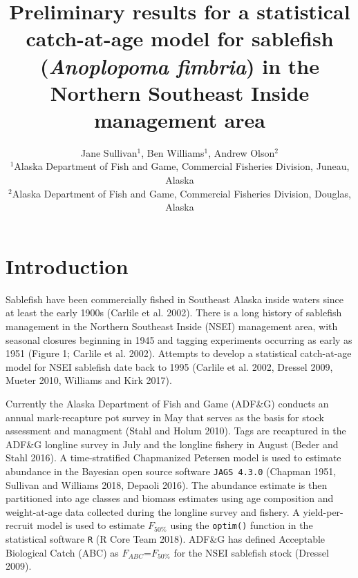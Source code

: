\documentclass[]{article}
\title{Preliminary results for a statistical catch-at-age model for sablefish
(\emph{Anoplopoma fimbria}) in the Northern Southeast Inside management
area}
\author{Jane Sullivan\(^1\), Ben Williams\(^1\), Andrew Olson\(^2\)\\
\(^1\)Alaska Department of Fish and Game, Commercial Fisheries Division,
Juneau, Alaska\\
\(^2\)Alaska Department of Fish and Game, Commercial Fisheries Division,
Douglas, Alaska}
\date{}
\begin{document}
\maketitle

{
\setcounter{tocdepth}{2}
\tableofcontents
}
\section{Introduction}\label{introduction}

Sablefish have been commercially fished in Southeast Alaska inside
waters since at least the early 1900s (Carlile et al. 2002). There is a
long history of sablefish management in the Northern Southeast Inside
(NSEI) management area, with seasonal closures beginning in 1945 and
tagging experiments occurring as early as 1951 (Figure 1; Carlile et al.
2002). Attempts to develop a statistical catch-at-age model for NSEI
sablefish date back to 1995 (Carlile et al. 2002, Dressel 2009, Mueter
2010, Williams and Kirk 2017).

Currently the Alaska Department of Fish and Game (ADF\&G) conducts an
annual mark-recapture pot survey in May that serves as the basis for
stock assessment and managment (Stahl and Holum 2010). Tags are
recaptured in the ADF\&G longline survey in July and the longline
fishery in August (Beder and Stahl 2016). A time-stratified Chapmanized
Petersen model is used to estimate abundance in the Bayesian open source
software \texttt{JAGS\ 4.3.0} (Chapman 1951, Sullivan and Williams 2018,
Depaoli 2016). The abundance estimate is then partitioned into age
classes and biomass estimates using age composition and weight-at-age
data collected during the longline survey and fishery. A
yield-per-recruit model is used to estimate \(F_{50\%}\) using the
\texttt{optim()} function in the statistical software \texttt{R} (R Core
Team 2018). ADF\&G has defined Acceptable Biological Catch (ABC) as
\(F_{ABC}\)=\(F_{50\%}\) for the NSEI sablefish stock (Dressel 2009).
\end{document}
